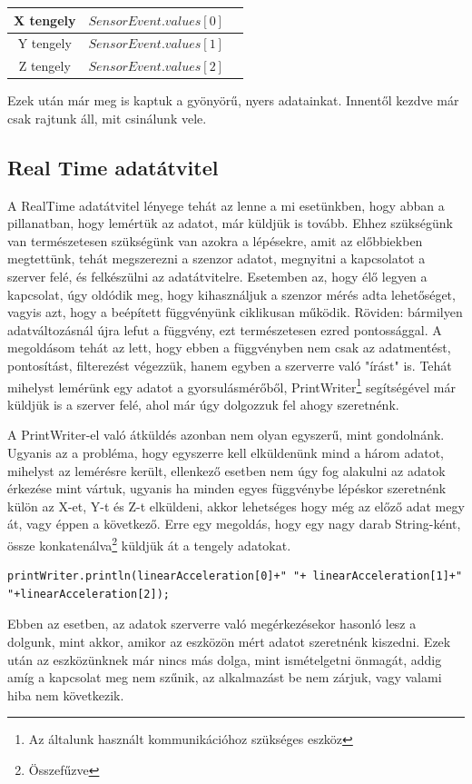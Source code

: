 \documentclass{thesis-ekf}
\theoremstyle{definition}
\theoremstyle{remark}
\begin{document}
\begin{center}
	\begin{tabular}{ |c|c|c| } 
		\hline
		X tengely & $SensorEvent.values[0]$  \\
		\hline
		Y tengely & $SensorEvent.values[1]$\\
		\hline
		Z tengely & $SensorEvent.values[2]$ \\
		\hline
	\end{tabular}
\end{center}
\par Ezek után már meg is kaptuk a gyönyörű, nyers adatainkat. Innentől kezdve már csak rajtunk áll, mit csinálunk vele.
\subsection{Real Time adatátvitel}
A RealTime adatátvitel lényege tehát az lenne a mi esetünkben, hogy abban a pillanatban, hogy lemértük az adatot, már küldjük is tovább. Ehhez szükségünk van természetesen szükségünk van azokra a lépésekre, amit az előbbiekben megtettünk, tehát megszerezni a szenzor adatot, megnyitni a kapcsolatot a szerver felé, és felkészülni az adatátvitelre. Esetemben az, hogy élő legyen a kapcsolat, úgy oldódik meg, hogy kihasználjuk a szenzor mérés adta lehetőséget, vagyis azt, hogy a beépített függvényünk ciklikusan működik. Röviden: bármilyen adatváltozásnál újra lefut a függvény, ezt természetesen ezred pontossággal. A megoldásom tehát az lett, hogy ebben a függvényben nem csak az adatmentést, pontosítást, filterezést végezzük, hanem egyben a szerverre való "írást" is. Tehát mihelyst lemérünk egy adatot a gyorsulásmérőből, PrintWriter\footnote{Az általunk használt kommunikációhoz szükséges eszköz} segítségével már küldjük is a szerver felé, ahol már úgy dolgozzuk fel ahogy szeretnénk.
\par A PrintWriter-el való átküldés azonban nem olyan egyszerű, mint gondolnánk. Ugyanis az a probléma, hogy egyszerre kell elküldenünk mind a három adatot, mihelyst az lemérésre került, ellenkező esetben nem úgy fog alakulni az adatok érkezése mint vártuk, ugyanis ha minden egyes függvénybe lépéskor szeretnénk külön az X-et, Y-t és Z-t elküldeni, akkor lehetséges hogy még az előző adat megy át, vagy éppen a következő. Erre egy megoldás, hogy egy nagy darab String-ként, össze konkatenálva\footnote{Összefűzve} küldjük át a tengely adatokat.
\begin{lstlisting}
printWriter.println(linearAcceleration[0]+" "+ linearAcceleration[1]+" "+linearAcceleration[2]);
\end{lstlisting}
\par Ebben az esetben, az adatok szerverre való megérkezésekor hasonló lesz a dolgunk, mint akkor, amikor az eszközön mért adatot szeretnénk kiszedni. Ezek után az eszközünknek már nincs más dolga, mint ismételgetni önmagát, addig amíg a kapcsolat meg nem szűnik, az alkalmazást be nem zárjuk, vagy valami hiba nem következik.
\end{document}
